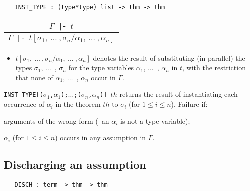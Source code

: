 \begin{boxed}
\begin{verbatim}
   INST_TYPE : (type*type) list -> thm -> thm
\end{verbatim}\end{boxed}

\begin{center}
\begin{tabular}{c}
$\Gamma${\small\verb+ |- +}$t$ \\ \hline
$\Gamma${\small\verb+ |- +}$t[\sigma_1,\ \ldots\ ,\sigma_n/\alpha_1,\ \ldots\ ,\alpha_n]$
\end{tabular}
\end{center}

\bigskip

\begin{itemize}
\item $t[\sigma_1,\ \ldots\ ,\sigma_n/\alpha_1,\ \ldots\ ,\alpha_n]$
denotes the result of substituting (in parallel) the types $\sigma_1$,
$\ldots$\ , $\sigma_n$ for the type variables $\alpha_1$, $\ldots$\ ,
$\alpha_n$ in $t$, with the restriction that none of $\alpha_1$, $\ldots$\
, $\alpha_n$ occur in $\Gamma$.
\end{itemize}

\noindent
{\small\verb+INST_TYPE[(+}$\sigma_1${\small\verb+,+}$\alpha_1${\small\verb+);+}$\ldots${\small\verb+;(+}$\sigma_n${\small\verb+,+}$\alpha_n${\small\verb+)] +}$th$
returns the result of instantiating each occurrence of $\alpha_i$ in the
theorem $th$ to $\sigma_i$ (for $1 \leq i \leq n$). Failure if:
\begin{myenumerate}
\item arguments of the wrong form (\eg\ an $\alpha_i$ is not a type variable);
\item $\alpha_i$
(for $1\leq i\leq n$) occurs in any assumption in $\Gamma$.
\end{myenumerate}

\bigskip

\subsection{Discharging an assumption}


\begin{boxed}
\begin{verbatim}
   DISCH : term -> thm -> thm
\end{verbatim}\end{boxed}

